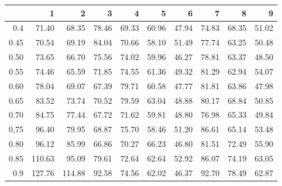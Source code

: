\begin{table}[ht]
\centering
\begin{tabular}{rrrrrrrrrr}
  \hline
 & 1 & 2 & 3 & 4 & 5 & 6 & 7 & 8 & 9 \\ 
  \hline
0.4 & 71.40 & 68.35 & 78.46 & 69.33 & 60.96 & 47.94 & 74.83 & 68.35 & 51.02 \\ 
  0.45 & 70.54 & 69.19 & 84.04 & 70.66 & 58.10 & 51.49 & 77.74 & 63.25 & 50.48 \\ 
  0.50 & 73.65 & 66.70 & 75.56 & 74.02 & 59.96 & 46.27 & 78.81 & 63.37 & 48.50 \\ 
  0.55 & 74.46 & 65.59 & 71.85 & 74.55 & 61.36 & 49.32 & 81.29 & 62.94 & 54.07 \\ 
  0.60 & 78.04 & 69.07 & 67.39 & 79.71 & 60.58 & 47.77 & 81.81 & 63.86 & 47.98 \\ 
  0.65 & 83.52 & 73.74 & 70.52 & 79.59 & 63.04 & 48.88 & 80.17 & 68.84 & 50.85 \\ 
  0.70 & 84.75 & 77.44 & 67.72 & 71.62 & 59.81 & 48.80 & 76.98 & 65.33 & 49.84 \\ 
  0,75 & 96.40 & 79.95 & 68.87 & 75.70 & 58.46 & 51.20 & 86.61 & 65.14 & 53.48 \\ 
  0.80 & 96.12 & 85.99 & 66.86 & 70.27 & 66.23 & 46.80 & 81.51 & 72.49 & 55.90 \\ 
  0.85 & 110.63 & 95.09 & 79.61 & 72.64 & 62.64 & 52.92 & 86.07 & 74.19 & 63.05 \\ 
  0.9 & 127.76 & 114.88 & 92.58 & 74.56 & 62.02 & 46.37 & 92.70 & 78.49 & 62.87 \\ 
   \hline
\end{tabular}
\end{table}
